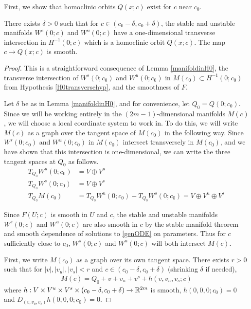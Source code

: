 \documentclass[thesis.tex]{subfiles}
\begin{document}
First, we show that homoclinic orbits $Q(x; c)$ exist for $c$ near $c_0$.

\begin{lemma}
There exists $\delta > 0$ such that for $c \in (c_0 - \delta, c_0 + \delta)$, the stable and unstable manifolds $W^s(0; c)$ and $W^u(0; c)$ have a one-dimensional transverse intersection in $H^{-1}(0; c)$ which is a homoclinic orbit $Q(x; c)$. The map $c \rightarrow Q(x; c)$ is smooth.

\begin{proof}
This is a straightforward consequence of Lemma \ref{manifoldinH0}, the transverse intersection of $W^s(0; c_0)$ and $W^u(0; c_0)$ in $M(c_0) \subset H^{-1}(0; c_0)$ from Hypothesis \ref{H0transversehyp}, and the smoothness of $F$.

Let $\delta$ be as in Lemma \ref{manifoldinH0}, and for convenience, let $Q_0 = Q(0; c_0)$. Since we will be working entirely in the $(2m-1)$-dimensional manifolds $M(c)$, we will choose a local coordinate system to work in. To do this, we will write $M(c)$ as a graph over the tangent space of $M(c_0)$ in the following way. Since $W^s(0; c_0)$ and $W^u(0; c_0)$ in $M(c_0)$ intersect transversely in $M(c_0)$, and we have shown that this intersection is one-dimensional, we can write the three tangent spaces at $Q_0$ as follows.
\begin{align*}
T_{Q_0}W^u(0; c_0) &= V \oplus V^u \\
T_{Q_0}W^s(0; c_0) &= V \oplus V^s \\
T_{Q_0}M(c_0) &= T_{Q_0}W^u(0; c_0) 
+ T_{Q_0}W^s(0; c_0) = V \oplus V^u \oplus V^s
\end{align*}

Since $F(U; c)$ is smooth in $U$ and $c$, the stable and unstable manifolds $W^s(0; c)$ and $W^u(0; c)$ are also smooth in $c$ by the stable manifold theorem and smooth dependence of solutions to \eqref{genODE} on parameters. Thus for $c$ sufficiently close to $c_0$, $W^s(0; c)$ and $W^u(0; c)$ will both intersect $M(c)$. 

First, we write $M(c_0)$ as a graph over its own tangent space. There exists $r > 0$ such that for $|v|, |v_u|, |v_s| < r$ and $c \in (c_0 - \delta, c_0 + \delta)$ (shrinking $\delta$ if needed), 
\begin{align*}
M(c) = Q_0 + v + v_u + v^s + h(v, v_u, v_s; c)
\end{align*}
where $h: V \times V^u \times V^s \times (c_0 - \delta, c_0 + \delta) \rightarrow {\mathbb R}^{2m}$ is smooth, $h(0,0,0; c_0) = 0$ and $D_{(v, v_u, v_s)} h(0, 0, 0; c_0) = 0$.


\end{proof}
\end{lemma}
\end{document}
